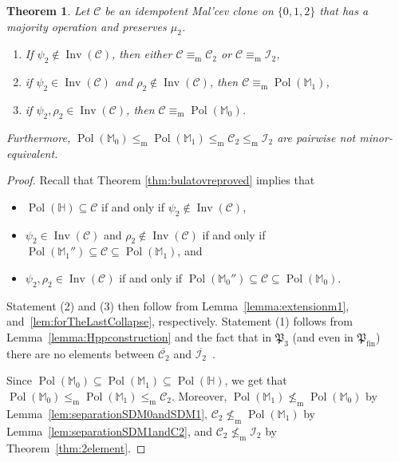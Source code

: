 \documentclass[12pt]{amsart}
\newtheorem{theorem}{Theorem}[section]
\theoremstyle{definition}
\theoremstyle{definition}
\newcommand{\Pfin}{\mathfrak P_{\mathrm{fin}}}
\newcommand{\struct}[1]{\mathbb{#1}}
\newcommand{\clo}[1]{\mathcal{#1}}
\DeclareMathOperator{\Pol}{Pol}
\DeclareMathOperator{\Inv}{Inv}
\newcommand{\isaminorof}{\leq_{\mathrm{m}}}
\newcommand{\notisaminorof}{\nleq_{\mathrm{m}}}
\newcommand{\minorequivalentto}{\equiv_{\mathrm{m}}}
\begin{document}
\begin{theorem} \label{theorem:classesOfSDmeetMalcev}
Let $\mathcal C$ be an idempotent Mal'cev clone on $\{0,1,2\}$ that has a majority operation and preserves $\mu_2$.
\begin{enumerate}
\item If $\psi_2 \notin \Inv(\mathcal C)$, then either $\mathcal C  \minorequivalentto \mathcal C_2$ or $\mathcal C  \minorequivalentto \mathcal I_2$,
\item if $\psi_2 \in \Inv(\mathcal C)$ and $\rho_2 \notin \Inv(\mathcal C)$, then $\mathcal C  \minorequivalentto \Pol(\mathbb M_1)$,
\item if $\psi_2, \rho_2 \in \Inv(\mathcal C)$, then $\mathcal C  \minorequivalentto \Pol(\mathbb M_0)$.
\end{enumerate}
Furthermore, $\Pol(\mathbb M_0) \isaminorof \Pol(\mathbb M_1) \isaminorof \mathcal C_2 \isaminorof \mathcal I_2$ are pairwise not minor-equivalent. 
\end{theorem} 

\begin{proof}
Recall that Theorem \ref{thm:bulatovreproved} implies that 
\begin{itemize}
\item $\Pol(\mathbb H) \subseteq \mathcal C$ if and only if $\psi_2 \notin \Inv(\mathcal C)$,
\item $\psi_2 \in \Inv(\mathcal C)$ and $\rho_2 \notin \Inv(\mathcal C)$ if and only if $\Pol(\mathbb M_1'') \subseteq \mathcal C \subseteq \Pol(\mathbb M_1)$, and
\item $\psi_2, \rho_2 \in \Inv(\mathcal C)$ if and only if $ \Pol(\mathbb M_0'') \subseteq \mathcal C  \subseteq \Pol(\mathbb M_0)$.
\end{itemize}
Statement (2) and (3) then follow from Lemma~\ref{lemma:extensionm1}, and~\ref{lem:forTheLastCollapse}, respectively. Statement (1) follows from Lemma~\ref{lemma:Hppconstruction} and the fact that in $\mathfrak{P}_3$ (and even in $\Pfin$) there are no elements between $\overline{\clo{C}_2}$ and $\overline{\clo{I}_2}$~\cite{VucajZhuk, meyerSubmaximal}.

Since $\Pol(\mathbb M_0) \subseteq \Pol(\mathbb M_1) \subseteq \Pol(\mathbb H)$, we get that $\Pol(\mathbb M_0) \isaminorof \Pol(\mathbb M_1) \isaminorof \mathcal C_2$. Moreover,  $\Pol(\struct{M}_1) \notisaminorof \Pol(\struct{M}_0)$ by Lemma~\ref{lem:separationSDM0andSDM1}, $\clo{C}_2 \notisaminorof \Pol(\struct{M}_1)$ by Lemma~\ref{lem:separationSDM1andC2}, and $\clo{C}_2 \notisaminorof \clo{I}_2$ by Theorem~\ref{thm:2element}. 
\end{proof}
\end{document}
